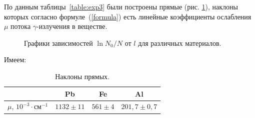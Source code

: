 \documentclass[a4paper, 12pt]{article}%
\begin{document}
	
		По данным таблицы~\ref{table:exp3} были построены прямые (рис. \ref{fig:graph}), наклоны которых согласно формуле~(\ref{formula}) есть линейные коэффициенты ослабления $\mu$ потока $\gamma$-излучения в веществе.
	
\newpage
	
		\begin{figure}[h!]
			\caption{Графики зависимостей $\ln N_0/N$ от $l$ для различных материалов.}\label{fig:graph}
		\end{figure}
			
		Имеем:
		\begin{table}[!h]
		\begin{center}
			\caption{Наклоны прямых.}
			\label{table:final}
			\begin{tabular}{|c|c|c|c|}
				\hline
				& Pb          & Fe         & Al                         \\ \hline
				$\mu$, $10^{-3}\cdot \text{см}^{-1}$ & $1132\pm11$ & $561\pm 4$ & $201,7\pm 0,7$ \\ \hline
			\end{tabular}
		\end{center}
		\end{table}

	
\newpage
\end{document}
